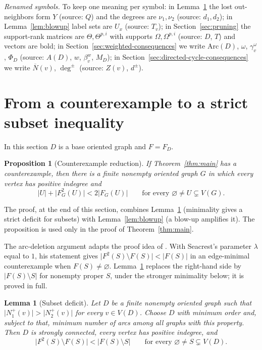 \documentclass[11pt]{article}
\newtheorem{lemma}[theorem]{Lemma}
\newtheorem{proposition}[theorem]{Proposition}
\theoremstyle{remark}
\newcommand{\abs}[1]{\lvert #1\rvert}
\begin{document}
\emph{Renamed symbols.} To keep one meaning per symbol: in
Lemma~\ref{lem:subset-deficit} the lost out-neighbors form $Y$ (source: $Q$)
and the degrees are $\nu_1,\nu_2$ (source: $d_1,d_2$); in
Lemma~\ref{lem:blowup} label sets are $U_x$ (source: $T_v$); in
Section~\ref{sec:pruning} the support-rank matrices are $\Theta,\Theta^{p,i}$
with supports $\Omega,\Omega^{p,i}$ (source: $D$, $T$) and vectors are bold; in
Section~\ref{sec:weighted-consequences} we write $\mathrm{Arc}(D)$, $\omega$,
$\gamma_v^\omega$, $\Phi_D$ (source: $A(D)$, $w$, $\beta_v^w$, $M_D$); in
Section~\ref{sec:directed-cycle-consequences} we write $\overline N(v)$,
$\deg^\pm$ (source: $Z(v)$, $d^\pm$).

\section{From a counterexample to a strict subset inequality}
\label{sec:reduction}

In this section $D$ is a base oriented graph and $F=F_D$.

\begin{proposition}[Counterexample reduction]
\label{prop:counterexample-reduction}
If Theorem~\ref{thm:main} has a counterexample, then there is a finite
nonempty oriented graph $G$ in which every vertex has positive indegree
and
\begin{equation}
\label{eq:strict-subset-growth}
  \abs{U}+\abs{F_G^2(U)}<2\abs{F_G(U)}
  \qquad\text{for every }\varnothing\ne U\subsetneq V(G).
\end{equation}
\end{proposition}

The proof, at the end of this section, combines Lemma~\ref{lem:subset-deficit}
(minimality gives a strict deficit for subsets) with Lemma~\ref{lem:blowup}
(a blow-up amplifies it). The proposition is used only in the proof of
Theorem~\ref{thm:main}.

The arc-deletion argument adapts the proof idea of
\cite[Lemma~4]{Seacrest2019}. With Seacrest's parameter $\lambda$ equal to $1$,
his statement gives $\abs{F^2(S)\setminus F(S)}<\abs{F(S)}$ in an edge-minimal
counterexample when $F(S)\ne\varnothing$. Lemma~\ref{lem:subset-deficit}
replaces the right-hand side by $\abs{F(S)\setminus S}$ for nonempty proper
$S$, under the stronger minimality below; it is proved in full.

\begin{lemma}[Subset deficit]
\label{lem:subset-deficit}
Let $D$ be a finite nonempty oriented graph such that
$\abs{N_1^+(v)}>\abs{N_2^+(v)}$ for every $v\in V(D)$.
Choose $D$ with minimum order and, subject to that, minimum number of
arcs among all graphs with this property. Then $D$ is strongly connected,
every vertex has positive indegree, and
\begin{equation}
\label{eq:subset-deficit}
  \abs{F^2(S)\setminus F(S)}<\abs{F(S)\setminus S}
  \qquad\text{for every }\varnothing\ne S\subsetneq V(D).
\end{equation}
\end{lemma}
\end{document}
